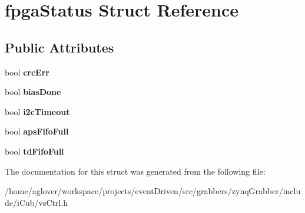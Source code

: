 \hypertarget{structfpgaStatus}{\section{fpga\-Status Struct Reference}
\label{structfpgaStatus}
}
\subsection*{Public Attributes}
\begin{DoxyCompactItemize}
\item 
\hypertarget{structfpgaStatus_a9cafcfd4e38fa240b31b47611bac3083}{bool {\bfseries crc\-Err}}\label{structfpgaStatus_a9cafcfd4e38fa240b31b47611bac3083}

\item 
\hypertarget{structfpgaStatus_aef80b6cd223b1195b317a70e7f57b58c}{bool {\bfseries bias\-Done}}\label{structfpgaStatus_aef80b6cd223b1195b317a70e7f57b58c}

\item 
\hypertarget{structfpgaStatus_ab37e07a6f39e462634df9d560c0abe45}{bool {\bfseries i2c\-Timeout}}\label{structfpgaStatus_ab37e07a6f39e462634df9d560c0abe45}

\item 
\hypertarget{structfpgaStatus_a01141df5867a1c152efd241a5341cfb7}{bool {\bfseries aps\-Fifo\-Full}}\label{structfpgaStatus_a01141df5867a1c152efd241a5341cfb7}

\item 
\hypertarget{structfpgaStatus_a432c220a53f8a0639cb2b0ef1284ef14}{bool {\bfseries td\-Fifo\-Full}}\label{structfpgaStatus_a432c220a53f8a0639cb2b0ef1284ef14}

\end{DoxyCompactItemize}


The documentation for this struct was generated from the following file\-:\begin{DoxyCompactItemize}
\item 
/home/aglover/workspace/projects/event\-Driven/src/grabbers/zynq\-Grabber/include/i\-Cub/vs\-Ctrl.\-h\end{DoxyCompactItemize}

